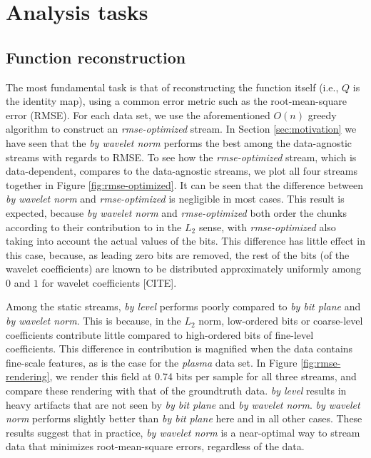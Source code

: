 \section{Analysis tasks}
\subsection{Function reconstruction}

The most fundamental task is that of reconstructing the function itself (i.e., $Q$ is the identity
map), using a common error metric such as the root-mean-square error (RMSE). For each data set, we
use the aforementioned $O(n)$ greedy algorithm to construct an \emph{rmse-optimized} stream. In
Section \ref{sec:motivation} we have seen that the \emph{by wavelet norm} performs the best among
the data-agnostic streams with regards to RMSE. To see how the \emph{rmse-optimized} stream, which
is data-dependent, compares to the data-agnostic streams, we plot all four streams together in
Figure \ref{fig:rmse-optimized}. It can be seen that the difference between \emph{by wavelet norm}
and \emph{rmse-optimized} is negligible in most cases. This result is expected, because \emph{by
wavelet norm} and \emph{rmse-optimized} both order the chunks according to their contribution to in
the $L_2$ sense, with \emph{rmse-optimized} also taking into account the actual values of the bits.
This difference has little effect in this case, because, as leading zero bits are removed, the rest
of the bits (of the wavelet coefficients) are known to be distributed approximately uniformly among
$0$ and $1$ for wavelet coefficients [CITE]. 

Among the static streams, \emph{by level} performs poorly compared to \emph{by bit plane} and
\emph{by wavelet norm}. This is because, in the $L_2$ norm, low-ordered bits or coarse-level
coefficients contribute little compared to high-ordered bits of fine-level coefficients. This
difference in contribution is magnified when the data contains fine-scale features, as is the case
for the \emph{plasma} data set. In Figure \ref{fig:rmse-rendering}, we render this field at 0.74
bits per sample for all three streams, and compare these rendering with that of the groundtruth
data. \emph{by level} results in heavy artifacts that are not seen by \emph{by bit plane} and
\emph{by wavelet norm}. \emph{by wavelet norm} performs slightly better than \emph{by bit plane}
here and in all other cases. These results suggest that in practice, \emph{by wavelet norm} is a
near-optimal way to stream data that minimizes root-mean-square errors, regardless of the data.

